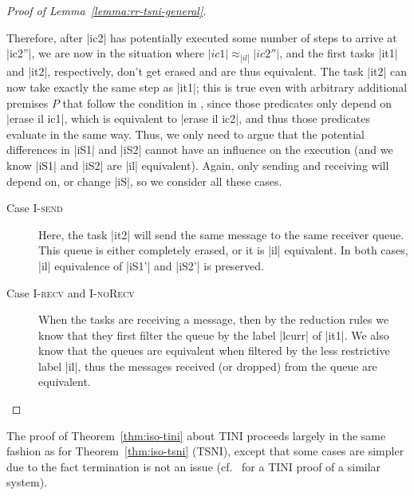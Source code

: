 \begin{proof}[Proof of Lemma~\ref{lemma:rr-tsni-general}]
\begin{itemize}
    
    Therefore, after |ic2| has potentially executed some number of steps
    to arrive at |ic2''|, we are now in the situation where $|ic1|\approx_{|il|}|ic2''|$, and the first tasks |it1| and |it2|,
    respectively, don't get erased and are thus equivalent.
    The task |it2| can now take exactly the same step as |it1|;  this
    is true even with arbitrary additional premises $P$ that follow
    the condition in , since those
    predicates only depend on |erase il ic1|, which is equivalent
    to |erase il ic2|, and thus those predicates evaluate in the same way.
    Thus, we only
    need to argue that the potential differences in |iS1| and |iS2| cannot
    have an influence on the execution (and we know |iS1| and |iS2| are
    |il| equivalent).
    Again, only sending and receiving will depend on, or change |iS|,
    so we consider all these cases.
    \begin{description}
      \item[Case \textsc{I-send}]
      Here, the task |it2| will send the same message to the same
      receiver queue. This
      queue is either completely erased, or it is |il| equivalent.  In both
      cases, |il| equivalence of |iS1'| and |iS2'| is preserved.
      \item[Case \textsc{I-recv} and \textsc{I-noRecv}]
      When the tasks are receiving a message, then by the reduction rules
      we know that they first filter the queue by the label
      |lcurr| of |it1|.  We
      also know that the queues are equivalent when filtered by the less
      restrictive label |il|, thus the messages received (or dropped) from the
      queue are equivalent.
    \end{description}
  \end{itemize}
\end{proof}


The proof of Theorem~\ref{thm:iso-tini} about TINI proceeds largely
in the same fashion as for Theorem~\ref{thm:iso-tsni} (TSNI), except that
some cases are simpler due to the fact termination is not an issue
(cf.~\tocite{} for a TINI proof of a similar system).
